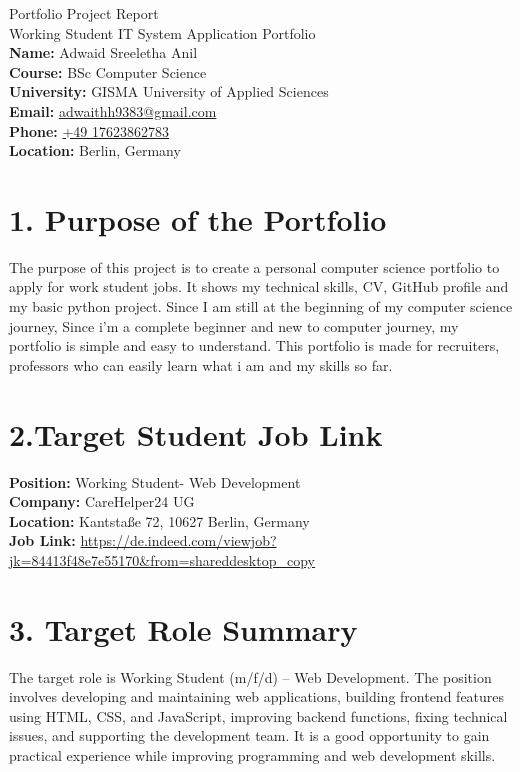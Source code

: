 \documentclass[12pt,a4paper]{article}
\begin{document}
\begin{center}
    {\LARGE Portfolio Project Report}\\[6pt]
    {\large Working Student IT System Application Portfolio}\\[12pt]
    \textbf{Name:} Adwaid Sreeletha Anil\\
    \textbf{Course:} BSc Computer Science\\
    \textbf{University:} GISMA University of Applied Sciences\\
    \textbf{Email:} \href{mailto:adwaithh9383@gmail.com}{adwaithh9383@gmail.com}\\
    \textbf{Phone:} \href{tel:+4917623862783}{+49 17623862783}\\
    \textbf{Location:} Berlin, Germany
\end{center}

\section{1. Purpose of the Portfolio}

The purpose of this project is to create a personal computer science portfolio to apply for work student jobs. It shows my technical skills, CV, GitHub profile and my basic python project. Since I am still at the beginning of my computer science journey, Since i'm a complete beginner and new to computer journey, my portfolio is simple and easy to understand. This portfolio is made for recruiters, professors who can easily learn what i am and my skills so far.

\section{2.Target Student Job Link}

\textbf{Position:} Working Student- Web Development\\
\textbf{Company:} CareHelper24 UG\\
\textbf{Location:} Kantstaße 72, 10627 Berlin, Germany\\
\textbf{Job Link:} \url{https://de.indeed.com/viewjob?jk=84413f48e7e55170&from=shareddesktop_copy}

\section{3. Target Role Summary}

The target role is Working Student (m/f/d) – Web Development. The position involves developing and maintaining web applications, building frontend features using HTML, CSS, and JavaScript, improving backend functions, fixing technical issues, and supporting the development team. It is a good opportunity to gain practical experience while improving programming and web development skills.
\end{document}
